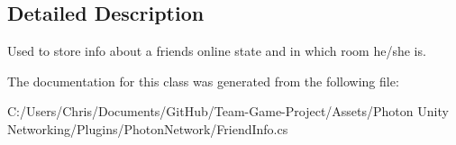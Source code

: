 \subsection{Detailed Description}
Used to store info about a friend\textquotesingle{}s online state and in which room he/she is. 



The documentation for this class was generated from the following file\+:\begin{DoxyCompactItemize}
\item 
C\+:/\+Users/\+Chris/\+Documents/\+Git\+Hub/\+Team-\/\+Game-\/\+Project/\+Assets/\+Photon Unity Networking/\+Plugins/\+Photon\+Network/Friend\+Info.\+cs\end{DoxyCompactItemize}
